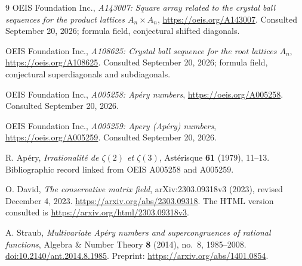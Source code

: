 \documentclass[11pt]{article}
\numberwithin{equation}{section}
\theoremstyle{definition}
\theoremstyle{remark}
\begin{document}
\begin{thebibliography}{9}
\small
\setlength{\itemsep}{3pt}
OEIS Foundation Inc.,
\emph{A143007: Square array related to the crystal ball sequences
for the product lattices $A_n\times A_n$},
\url{https://oeis.org/A143007}.
Consulted September 20, 2026; formula field, conjectural shifted diagonals.

OEIS Foundation Inc.,
\emph{A108625: Crystal ball sequence for the root lattices $A_n$},
\url{https://oeis.org/A108625}.
Consulted September 20, 2026; formula field, conjectural superdiagonals
and subdiagonals.

OEIS Foundation Inc.,
\emph{A005258: Ap\'ery numbers},
\url{https://oeis.org/A005258}.
Consulted September 20, 2026.

OEIS Foundation Inc.,
\emph{A005259: Apery (Ap\'ery) numbers},
\url{https://oeis.org/A005259}.
Consulted September 20, 2026.

R. Ap\'ery,
\emph{Irrationalit\'e de $\zeta(2)$ et $\zeta(3)$},
Ast\'erisque \textbf{61} (1979), 11--13.
Bibliographic record linked from OEIS A005258 and A005259.

O. David,
\emph{The conservative matrix field},
arXiv:2303.09318v3 (2023), revised December 4, 2023.
\url{https://arxiv.org/abs/2303.09318}.
The HTML version consulted is
\url{https://arxiv.org/html/2303.09318v3}.

A. Straub,
\emph{Multivariate Ap\'ery numbers and supercongruences of rational functions},
Algebra \& Number Theory \textbf{8} (2014), no.~8, 1985--2008.
\href{https://doi.org/10.2140/ant.2014.8.1985}{doi:10.2140/ant.2014.8.1985}.
Preprint: \url{https://arxiv.org/abs/1401.0854}.
\end{thebibliography}
\end{document}
